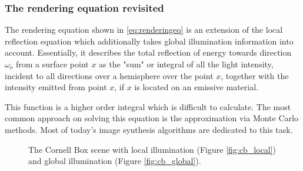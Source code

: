 \subsubsection{The rendering equation revisited}
The rendering equation shown in \ref{eq:renderingeq} is an extension of the local reflection equation which additionally takes global illumination information into account. Essentially, it describes the total reflection of energy towards direction $\omega_{o}$ from a surface point $x$ as the "sum" or integral of all the light intensity, incident to all directions over a hemisphere over the point $x$, together with the intensity emitted from point $x$, if $x$ is located on an emissive material.

This function is a higher order integral which is difficult to calculate. The most common approach on solving this equation is the approximation via Monte Carlo methods. Most of today's image synthesis algorithms are dedicated to this task.


\begin{figure}
	\centering
	\hfill
	\caption{The Cornell Box scene with local illumination (Figure \ref{fig:cb_local}) and global illumination (Figure \ref{fig:cb_global}).}
\end{figure}



